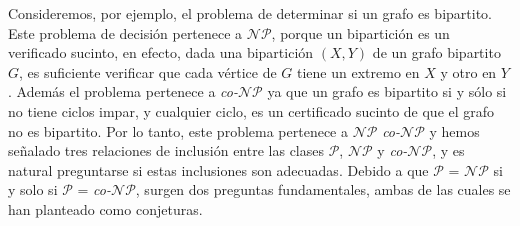 \documentclass{article}
\begin{document}
Consideremos, por ejemplo, el problema de determinar
si un grafo es bipartito. Este problema de decisión pertenece
a $\mathcal{N}\mathcal{P}$, porque un bipartición es un verificado
sucinto, en efecto, dada una bipartición $(X,Y)$ de un grafo
bipartito $G$, es suficiente verificar que cada vértice de $G$
tiene un extremo en $X$ y otro en $Y$. Además el problema pertenece
a \textit{co-}$\mathcal{N}\mathcal{P}$ ya que un grafo es bipartito si y sólo
si no tiene ciclos impar, y cualquier ciclo, es un certificado sucinto
de que el grafo no es bipartito. Por lo tanto, este problema 
pertenece a $\mathcal{N}\mathcal{P}$ \textit{co-}$\mathcal{N}\mathcal{P}$ y 
hemos señalado tres relaciones de inclusión entre las clases \textit{$\mathcal{P}$}, \textit{$\mathcal{N}\mathcal{P}$} y \textit{co-$\mathcal{N}\mathcal{P}$}, y es natural preguntarse si estas inclusiones son adecuadas. Debido a que \textit{$\mathcal{P}$} = \textit{$\mathcal{N}\mathcal{P}$} si y solo si \textit{$\mathcal{P}$} = \textit{co-$\mathcal{N}\mathcal{P}$}, surgen dos preguntas fundamentales, ambas de las cuales se han planteado como conjeturas. 

\setlength{\fboxsep}{10pt}
\noindent{}

\noindent{}
\end{document}
